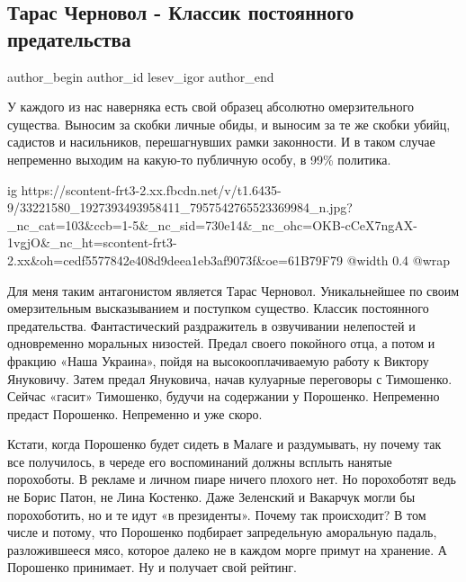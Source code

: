  
 
 
 
 
 
\subsection{Тарас Черновол - Классик постоянного предательства}
\label{sec:23_05_2018.fb.lesev_igor.1.taras_chernovol_klassik_predatelstva}
 
\ifcmt
 author_begin
   author_id lesev_igor
 author_end
\fi

У каждого из нас наверняка есть свой образец абсолютно омерзительного существа.
Выносим за скобки личные обиды, и выносим за те же скобки убийц, садистов и
насильников, перешагнувших рамки законности. И в таком случае непременно
выходим на какую-то публичную особу, в 99\% политика.

\ifcmt
  ig https://scontent-frt3-2.xx.fbcdn.net/v/t1.6435-9/33221580_1927393493958411_7957542765523369984_n.jpg?_nc_cat=103&ccb=1-5&_nc_sid=730e14&_nc_ohc=OKB-cCeX7ngAX-1vgjO&_nc_ht=scontent-frt3-2.xx&oh=cedf5577842e408d9deea1eb3af9073f&oe=61B79F79
  @width 0.4
  @wrap 
\fi

Для меня таким антагонистом является Тарас Черновол. Уникальнейшее по своим
омерзительным высказыванием и поступком существо. Классик постоянного
предательства. Фантастический раздражитель в озвучивании нелепостей и
одновременно моральных низостей. Предал своего покойного отца, а потом и
фракцию «Наша Украина», пойдя на высокооплачиваемую работу к Виктору Януковичу.
Затем предал Януковича, начав кулуарные переговоры с Тимошенко. Сейчас «гасит»
Тимошенко, будучи на содержании у Порошенко. Непременно предаст Порошенко.
Непременно и уже скоро.

Кстати, когда Порошенко будет сидеть в Малаге и раздумывать, ну почему так все
получилось, в череде его воспоминаний должны всплыть нанятые порохоботы. В
рекламе и личном пиаре ничего плохого нет. Но порохоботят ведь не Борис Патон,
не Лина Костенко. Даже Зеленский и Вакарчук могли бы порохоботить, но и те идут
«в президенты». Почему так происходит? В том числе и потому, что Порошенко
подбирает запредельную аморальную падаль, разложившееся мясо, которое далеко не
в каждом морге примут на хранение. А Порошенко принимает. Ну и получает свой
рейтинг.

